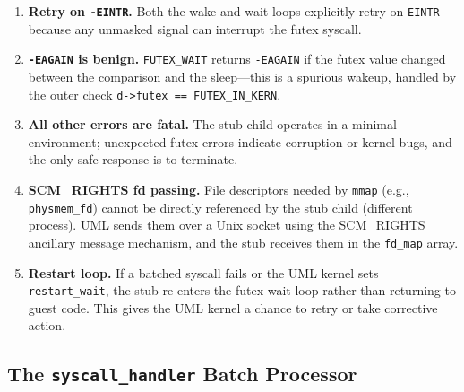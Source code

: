 \begin{enumerate}[nosep]
\item \textbf{Retry on \texttt{-EINTR}.}  Both the wake and wait loops
  explicitly retry on \texttt{EINTR} because any unmasked signal can interrupt
  the futex syscall.
\item \textbf{\texttt{-EAGAIN} is benign.}  \texttt{FUTEX\_WAIT} returns
  \texttt{-EAGAIN} if the futex value changed between the comparison and the
  sleep---this is a spurious wakeup, handled by the outer check
  \texttt{d->futex == FUTEX\_IN\_KERN}.
\item \textbf{All other errors are fatal.}  The stub child operates in a
  minimal environment; unexpected futex errors indicate corruption or kernel
  bugs, and the only safe response is to terminate.
\item \textbf{SCM\_RIGHTS fd passing.}  File descriptors needed by
  \texttt{mmap} (e.g., \texttt{physmem\_fd}) cannot be directly referenced by
  the stub child (different process).  UML sends them over a Unix socket
  using the SCM\_RIGHTS ancillary message mechanism, and the stub receives
  them in the \texttt{fd\_map} array.
\item \textbf{Restart loop.}  If a batched syscall fails or the UML kernel
  sets \texttt{restart\_wait}, the stub re-enters the futex wait loop rather
  than returning to guest code.  This gives the UML kernel a chance to retry
  or take corrective action.
\end{enumerate}

\subsection{The \texttt{syscall\_handler} Batch Processor}
\label{sec:impl-syscall-handler}

